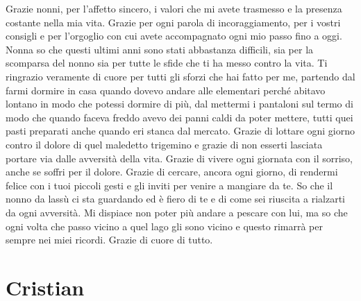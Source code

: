 \documentclass[12pt,a4paper,twoside]{report}
\begin{document}
Grazie nonni, per l'affetto sincero, i valori che mi avete trasmesso e la presenza costante nella mia vita. 
\newline Grazie per ogni parola di incoraggiamento, per i vostri consigli e per l'orgoglio con cui avete accompagnato ogni mio passo fino a oggi. 
\newline Nonna so che questi ultimi anni sono stati abbastanza difficili, sia per la scomparsa del nonno sia per tutte le sfide che ti ha messo contro la vita. 
\newline Ti ringrazio veramente di cuore per tutti gli sforzi che hai fatto per me, partendo dal farmi dormire in casa quando dovevo andare alle elementari perché abitavo lontano in modo che potessi dormire di più, dal mettermi i pantaloni sul termo di modo che quando faceva freddo avevo dei panni caldi da poter mettere, tutti quei pasti preparati anche quando eri stanca dal mercato. 
\newline Grazie di lottare ogni giorno contro il dolore di quel maledetto trigemino e grazie di non esserti lasciata portare via dalle avversità della vita. 
\newline Grazie di vivere ogni giornata con il sorriso, anche se soffri per il dolore. 
\newline Grazie di cercare, ancora ogni giorno, di rendermi felice con i tuoi piccoli gesti e gli inviti per venire a mangiare da te. 
\newline So che il nonno da lassù ci sta guardando ed è fiero di te e di come sei riuscita a rialzarti da ogni avversità. 
\newline Mi dispiace non poter più andare a pescare con lui, ma so che ogni volta che passo vicino a quel lago gli sono vicino e questo rimarrà per sempre nei miei ricordi. 
\newline Grazie di cuore di tutto.   

\clearpage
\section*{Cristian}
\end{document}

